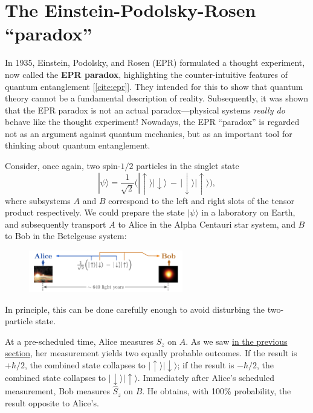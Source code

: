 \documentclass[pra,12pt]{revtex4-2}
\begin{document}
\section{The Einstein-Podolsky-Rosen ``paradox''}

In 1935, Einstein, Podolsky, and Rosen (EPR) formulated a thought
experiment, now called the \textbf{EPR paradox}, highlighting the
counter-intuitive features of quantum entanglement [\ref{cite:epr}].
They intended for this to show that quantum theory cannot be a
fundamental description of reality.  Subsequently, it was shown that
the EPR paradox is not an actual paradox---physical systems
\textit{really do} behave like the thought experiment!  Nowadays, the
EPR ``paradox'' is regarded not as an argument against quantum
mechanics, but as an important tool for thinking about quantum
entanglement.

Consider, once again, two spin-$1/2$ particles in the singlet state
\begin{equation}
  |\psi\rangle = \frac{1}{\sqrt{2}} \Big(|\!\uparrow\rangle|\!\downarrow\rangle \,-\, |\!\downarrow\rangle|\!\uparrow\rangle\Big),
  \label{eprsinglet}
\end{equation}
where subsystems $A$ and $B$ correspond to the left and right slots of
the tensor product respectively.  We could prepare the state
$|\psi\rangle$ in a laboratory on Earth, and subsequently transport
$A$ to Alice in the Alpha Centauri star system, and $B$ to Bob in the
Betelgeuse system:

\begin{figure}[h]
  \centering\includegraphics[width=0.6\textwidth]{epr}
\end{figure}

\noindent
In principle, this can be done carefully enough to avoid disturbing
the two-particle state.

At a pre-scheduled time, Alice measures $S_z$ on $A$.  As we saw
\hyperref[box:eproutcomes]{in the previous section}, her measurement
yields two equally probable outcomes.  If the result is $+\hbar/2$,
the combined state collapses to $|\!\uparrow\rangle
|\!\downarrow\rangle$; if the result is $-\hbar/2$, the combined state
collapses to $|\!\downarrow\rangle|\!\uparrow\rangle$.  Immediately
after Alice's scheduled measurement, Bob measures $\hat{S}_z$ on $B$.
He obtains, with 100\% probability, the result opposite to Alice's.
\end{document}
